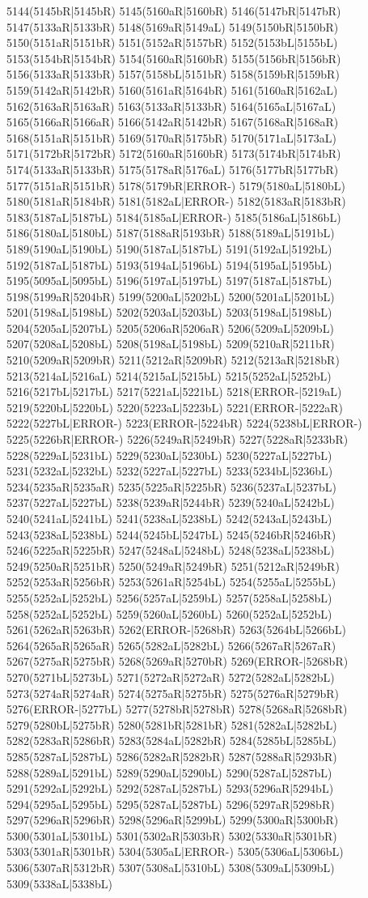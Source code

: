 5144(5145bR|5145bR) 5145(5160aR|5160bR) 5146(5147bR|5147bR) 5147(5133aR|5133bR) 5148(5169aR|5149aL) 5149(5150bR|5150bR) 5150(5151aR|5151bR) 5151(5152aR|5157bR) 5152(5153bL|5155bL) 5153(5154bR|5154bR) 5154(5160aR|5160bR) 5155(5156bR|5156bR) 5156(5133aR|5133bR) 5157(5158bL|5151bR) 5158(5159bR|5159bR) 5159(5142aR|5142bR) 5160(5161aR|5164bR) 5161(5160aR|5162aL) 5162(5163aR|5163aR) 5163(5133aR|5133bR) 5164(5165aL|5167aL) 5165(5166aR|5166aR) 5166(5142aR|5142bR) 5167(5168aR|5168aR) 5168(5151aR|5151bR) 5169(5170aR|5175bR) 5170(5171aL|5173aL) 5171(5172bR|5172bR) 5172(5160aR|5160bR) 5173(5174bR|5174bR) 5174(5133aR|5133bR) 5175(5178aR|5176aL) 5176(5177bR|5177bR) 5177(5151aR|5151bR) 5178(5179bR|ERROR-) 5179(5180aL|5180bL) 5180(5181aR|5184bR) 5181(5182aL|ERROR-) 5182(5183aR|5183bR) 5183(5187aL|5187bL) 5184(5185aL|ERROR-) 5185(5186aL|5186bL) 5186(5180aL|5180bL) 5187(5188aR|5193bR) 5188(5189aL|5191bL) 5189(5190aL|5190bL) 5190(5187aL|5187bL) 5191(5192aL|5192bL) 5192(5187aL|5187bL) 5193(5194aL|5196bL) 5194(5195aL|5195bL) 5195(5095aL|5095bL) 5196(5197aL|5197bL) 5197(5187aL|5187bL) 5198(5199aR|5204bR) 5199(5200aL|5202bL) 5200(5201aL|5201bL) 5201(5198aL|5198bL) 5202(5203aL|5203bL) 5203(5198aL|5198bL) 5204(5205aL|5207bL) 5205(5206aR|5206aR) 5206(5209aL|5209bL) 5207(5208aL|5208bL) 5208(5198aL|5198bL) 5209(5210aR|5211bR) 5210(5209aR|5209bR) 5211(5212aR|5209bR) 5212(5213aR|5218bR) 5213(5214aL|5216aL) 5214(5215aL|5215bL) 5215(5252aL|5252bL) 5216(5217bL|5217bL) 5217(5221aL|5221bL) 5218(ERROR-|5219aL) 5219(5220bL|5220bL) 5220(5223aL|5223bL) 5221(ERROR-|5222aR) 5222(5227bL|ERROR-) 5223(ERROR-|5224bR) 5224(5238bL|ERROR-) 5225(5226bR|ERROR-) 5226(5249aR|5249bR) 5227(5228aR|5233bR) 5228(5229aL|5231bL) 5229(5230aL|5230bL) 5230(5227aL|5227bL) 5231(5232aL|5232bL) 5232(5227aL|5227bL) 5233(5234bL|5236bL) 5234(5235aR|5235aR) 5235(5225aR|5225bR) 5236(5237aL|5237bL) 5237(5227aL|5227bL) 5238(5239aR|5244bR) 5239(5240aL|5242bL) 5240(5241aL|5241bL) 5241(5238aL|5238bL) 5242(5243aL|5243bL) 5243(5238aL|5238bL) 5244(5245bL|5247bL) 5245(5246bR|5246bR) 5246(5225aR|5225bR) 5247(5248aL|5248bL) 5248(5238aL|5238bL) 5249(5250aR|5251bR) 5250(5249aR|5249bR) 5251(5212aR|5249bR) 5252(5253aR|5256bR) 5253(5261aR|5254bL) 5254(5255aL|5255bL) 5255(5252aL|5252bL) 5256(5257aL|5259bL) 5257(5258aL|5258bL) 5258(5252aL|5252bL) 5259(5260aL|5260bL) 5260(5252aL|5252bL) 5261(5262aR|5263bR) 5262(ERROR-|5268bR) 5263(5264bL|5266bL) 5264(5265aR|5265aR) 5265(5282aL|5282bL) 5266(5267aR|5267aR) 5267(5275aR|5275bR) 5268(5269aR|5270bR) 5269(ERROR-|5268bR) 5270(5271bL|5273bL) 5271(5272aR|5272aR) 5272(5282aL|5282bL) 5273(5274aR|5274aR) 5274(5275aR|5275bR) 5275(5276aR|5279bR) 5276(ERROR-|5277bL) 5277(5278bR|5278bR) 5278(5268aR|5268bR) 5279(5280bL|5275bR) 5280(5281bR|5281bR) 5281(5282aL|5282bL) 5282(5283aR|5286bR) 5283(5284aL|5282bR) 5284(5285bL|5285bL) 5285(5287aL|5287bL) 5286(5282aR|5282bR) 5287(5288aR|5293bR) 5288(5289aL|5291bL) 5289(5290aL|5290bL) 5290(5287aL|5287bL) 5291(5292aL|5292bL) 5292(5287aL|5287bL) 5293(5296aR|5294bL) 5294(5295aL|5295bL) 5295(5287aL|5287bL) 5296(5297aR|5298bR) 5297(5296aR|5296bR) 5298(5296aR|5299bL) 5299(5300aR|5300bR) 5300(5301aL|5301bL) 5301(5302aR|5303bR) 5302(5330aR|5301bR) 5303(5301aR|5301bR) 5304(5305aL|ERROR-) 5305(5306aL|5306bL) 5306(5307aR|5312bR) 5307(5308aL|5310bL) 5308(5309aL|5309bL) 5309(5338aL|5338bL) 